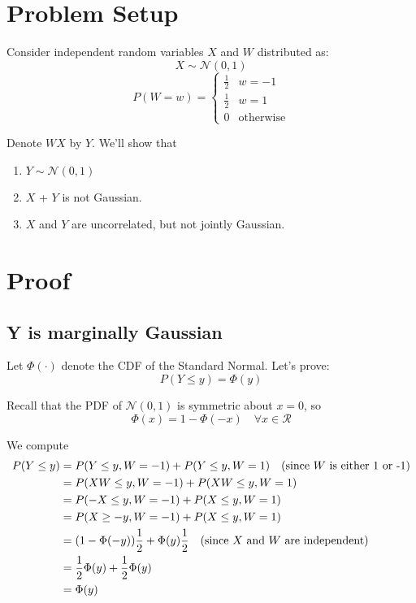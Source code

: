 \documentclass{article}
\begin{document}
\section{Problem Setup}

Consider independent random variables \( X \) and \( W \) distributed as:
\[
X \sim \mathcal{N}(0, 1)
\]
\[
P(W = w) = 
\begin{cases} 
\frac{1}{2} & w = -1 \\
\frac{1}{2} & w = 1 \\
0 & \text{otherwise}
\end{cases}
\]


Denote \( WX \) by \( Y \). We’ll show that
\begin{enumerate}
 \renewcommand{\labelenumi}{\theenumi)}

\item 
$Y \sim \mathcal{N}(0, 1)$
\item $X$ + $Y$ is not Gaussian.
\item  \( X \) and \( Y \) are uncorrelated, but not jointly Gaussian.
\end{enumerate}

\section{Proof}
\subsection{Y is marginally Gaussian}

Let \( \Phi(\cdot) \) denote the CDF of the Standard Normal. Let’s prove:
\begin{equation*}
P(Y \leq y) = \Phi(y)
\end{equation*}

Recall that the PDF of \( \mathcal{N}(0, 1) \) is symmetric about \( x = 0 \), so
\[
\Phi(x) = 1 - \Phi(-x) \quad \forall x \in \mathcal{R}
\]

We compute
\begin{align*}
P(Y \leq y) &= P(Y \leq y, W = -1) + P(Y \leq y, W = 1) \quad \text{(since \( W \) is either 1 or -1)}\\
&= P(XW \leq y, W = -1) + P(XW \leq y, W = 1)\\
&= P(-X \leq y, W = -1) + P(X \leq y, W = 1)\\
&= P(X \geq -y, W = -1) + P(X \leq y, W = 1)\\
&= (1 - \Phi(-y)) \frac{1}{2} + \Phi(y) \frac{1}{2} \quad \text{(since \( X \) and \( W \) are independent)}\\
&= \frac{1}{2} \Phi(y) + \frac{1}{2} \Phi(y)\\
&= \Phi(y)
\end{align*}
\end{document}
